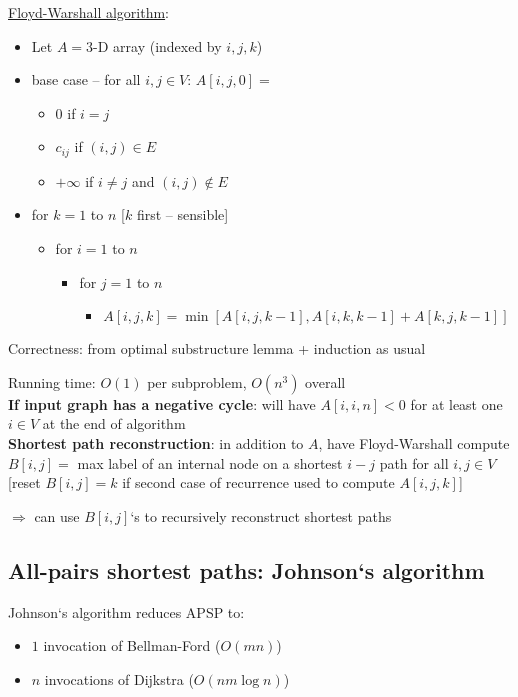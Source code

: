 \documentclass[a4paper,12pt]{article}
\theoremstyle{plain}
\theoremstyle{definition}
\theoremstyle{remark}
\begin{document}
\underline{Floyd-Warshall algorithm}:
\begin{itemize}
	\item Let $A = 3$-D array (indexed by $i, j, k$)
	\item base case -- for all $i, j \in V$: $A[i, j, 0] =$
	\begin{itemize}
		\item $0$ if $i = j$
		\item $c_{ij}$ if $(i, j) \in E$
		\item $+\infty$ if $i \neq j$ and $(i, j) \notin E$
	\end{itemize}
	\item for $k = 1$ to $n$ [$k$ first -- sensible]
	\begin{itemize}
		\item for $i = 1$ to $n$
		\begin{itemize}
			\item for $j = 1$ to $n$
			\begin{itemize}
				\item $A[i, j, k] = \min [A[i, j, k-1], A[i, k, k-1]+A[k, j, k-1]]$
			\end{itemize}
		\end{itemize}
	\end{itemize}
\end{itemize}

Correctness: from optimal substructure lemma + induction as usual

Running time: $O(1)$ per subproblem, $O(n^3)$ overall
\\

\textbf{If input graph has a negative cycle}: will have $A[i, i, n] < 0$ for at least one $i \in V$ at the end of algorithm
\\

\textbf{Shortest path reconstruction}: in addition to $A$, have Floyd-Warshall compute $B[i, j] =$ max label of an internal node on a shortest $i-j$ path for all $i, j \in V$ [reset $B[i, j]=k$ if second case of recurrence used to compute $A[i, j, k]$]

$\Rightarrow$ can use $B[i, j]$`s to recursively reconstruct shortest paths



\subsection{All-pairs shortest paths: Johnson`s algorithm}
Johnson`s algorithm reduces APSP to:
\begin{itemize}
	\item $1$ invocation of Bellman-Ford ($O(mn)$)
	\item $n$ invocations of Dijkstra ($O(nm \log n)$)
\end{itemize}
\end{document}
